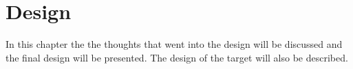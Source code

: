 \chapter{Design}
In this chapter the the thoughts that went into the design will be discussed and
the final design will be presented. The design of the target will also be
described.


